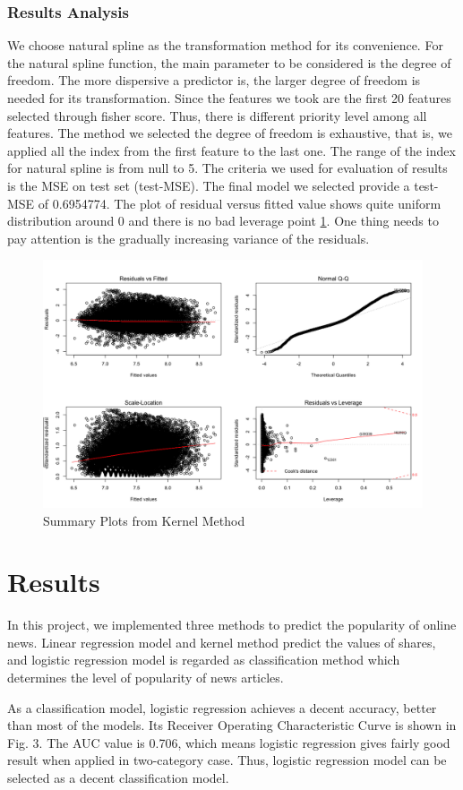 \documentclass[letterpaper,12pt]{article}
\begin{document}
\subsubsection{Results Analysis}
We choose natural spline as the transformation method for its convenience.  For the natural spline function, the main parameter to be considered is the degree of freedom. The more dispersive a predictor is, the larger degree of freedom is needed for its transformation. Since the features we took are the first 20 features selected through fisher score. Thus, there is different priority level among all features. The method we selected the degree of freedom is exhaustive, that is, we applied all the index from the first feature to the last one. The range of the index for natural spline is from null to 5. The criteria we used for evaluation of results is the MSE on test set (test-MSE). The final model we selected provide a test-MSE of 0.6954774. The plot of residual versus fitted value shows quite uniform distribution around 0 and there is no bad leverage point \ref{fig4}. One thing needs to pay attention is the gradually increasing variance of the residuals.  
\begin{figure}
\centering
    \includegraphics[width=0.7\linewidth]{4.png}
    \caption{Summary Plots from Kernel Method}
    \label{fig4}
\end{figure}

\section{Results}
In this project, we implemented three methods to predict the popularity of online news. Linear regression model and kernel method predict the values of shares, and logistic regression model is regarded as classification method which determines the level of popularity of news articles. 

As a classification model, logistic regression achieves a decent accuracy, better than most of the models. Its Receiver Operating Characteristic Curve is shown in Fig. 3. The AUC value is 0.706, which means logistic regression gives fairly good result when applied in two-category case. Thus, logistic regression model can be selected as a decent classification model.  
\end{document}
